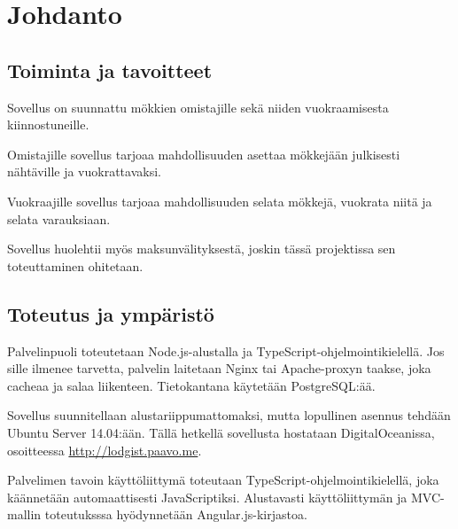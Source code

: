 \chapter{Johdanto}

\section{Toiminta ja tavoitteet}

Sovellus on suunnattu mökkien omistajille sekä niiden vuokraamisesta
kiinnostuneille.

Omistajille sovellus tarjoaa mahdollisuuden asettaa mökkejään julkisesti
nähtäville ja vuokrattavaksi.

Vuokraajille sovellus tarjoaa mahdollisuuden selata mökkejä, vuokrata
niitä ja selata varauksiaan.

Sovellus huolehtii myös maksunvälityksestä, joskin tässä projektissa sen
toteuttaminen ohitetaan.

\section{Toteutus ja ympäristö}\label{toteutus-ja-ympuxe4ristuxf6}

Palvelinpuoli toteutetaan Node.js-alustalla ja
TypeScript-ohjelmointikielellä. Jos sille ilmenee tarvetta, palvelin
laitetaan Nginx tai Apache-proxyn taakse, joka cacheaa ja salaa
liikenteen. Tietokantana käytetään PostgreSQL:ää.

Sovellus suunnitellaan alustariippumattomaksi, mutta lopullinen asennus tehdään Ubuntu Server 14.04:ään. Tällä hetkellä sovellusta hostataan DigitalOceanissa, osoitteessa
\url{http://lodgist.paavo.me}. 

Palvelimen tavoin käyttöliittymä toteutaan
TypeScript-ohjelmointikielellä, joka käännetään automaattisesti
JavaScriptiksi. Alustavasti käyttöliittymän ja MVC-mallin toteutuksssa
hyödynnetään Angular.js-kirjastoa.